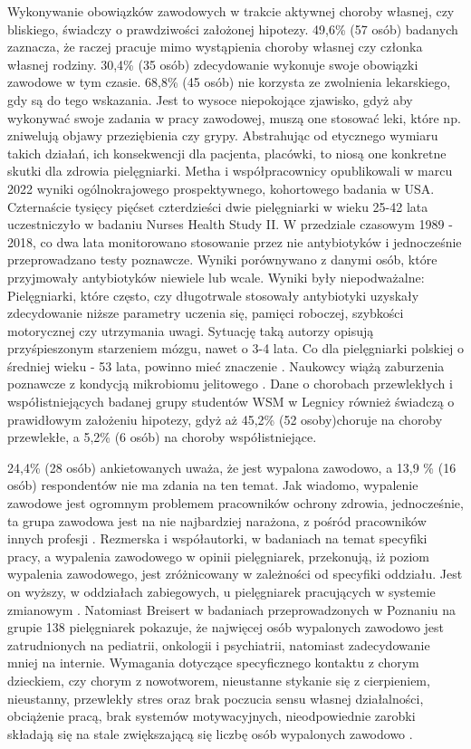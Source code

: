 \documentclass[a4paper,12pt,twoside,openany]{report}
\begin{document}
Wykonywanie obowiązków zawodowych w trakcie aktywnej choroby własnej, czy bliskiego, świadczy o prawdziwości założonej hipotezy. 49,6\%  (57 osób) badanych zaznacza, że raczej pracuje mimo wystąpienia choroby własnej czy członka własnej rodziny. 30,4\%  (35 osób) zdecydowanie wykonuje swoje obowiązki zawodowe w tym czasie. 68,8\% (45 osób) nie korzysta ze zwolnienia lekarskiego, gdy są do tego wskazania. Jest to wysoce niepokojące zjawisko, gdyż aby wykonywać swoje zadania w pracy zawodowej, muszą one stosować leki, które np. zniwelują objawy przeziębienia czy grypy. Abstrahując od etycznego wymiaru takich działań,  ich konsekwencji dla pacjenta, placówki, to niosą one konkretne skutki dla zdrowia pielęgniarki. Metha i współpracownicy opublikowali w marcu 2022 wyniki ogólnokrajowego prospektywnego, kohortowego badania  w USA. Czternaście tysięcy pięćset czterdzieści dwie  pielęgniarki w wieku 25-42 lata uczestniczyło w badaniu Nurses Health Study II. W przedziale czasowym 1989 - 2018, co dwa lata monitorowano stosowanie przez nie antybiotyków i jednocześnie przeprowadzano testy poznawcze. Wyniki porównywano z danymi osób, które przyjmowały antybiotyków niewiele lub wcale. Wyniki były niepodważalne: Pielęgniarki, które często, czy długotrwale stosowały antybiotyki uzyskały zdecydowanie niższe parametry uczenia się, pamięci roboczej, szybkości motorycznej czy utrzymania uwagi. Sytuację taką autorzy opisują przyśpieszonym starzeniem mózgu, nawet o 3-4 lata.  Co dla  pielęgniarki polskiej o średniej wieku - 53 lata, powinno mieć znaczenie \cite{statystyka}.  Naukowcy  wiążą zaburzenia poznawcze z  kondycją mikrobiomu jelitowego \cite{metha}.
Dane o chorobach przewlekłych i współistniejących badanej grupy  studentów WSM w Legnicy  również  świadczą o prawidłowym założeniu hipotezy, gdyż aż 45,2\%  (52 osoby)choruje na choroby przewlekłe, a 5,2\% (6 osób) na choroby współistniejące.


24,4\%  (28 osób) ankietowanych uważa, że jest wypalona zawodowo, a 13,9 \% (16 osób) respondentów nie ma zdania na ten temat. Jak wiadomo, wypalenie zawodowe jest ogromnym problemem pracowników ochrony zdrowia, jednocześnie, ta grupa zawodowa jest na nie najbardziej narażona,  z pośród pracowników innych profesji \cite{wypal}. Rezmerska i współautorki, w badaniach na temat specyfiki pracy, a wypalenia zawodowego w opinii pielęgniarek,  przekonują, iż poziom wypalenia zawodowego, jest zróżnicowany w zależności od specyfiki oddziału. Jest on wyższy, w oddziałach zabiegowych, u pielęgniarek pracujących w systemie zmianowym \cite{zmiany}. Natomiast Breisert w badaniach przeprowadzonych w Poznaniu na grupie 138 pielęgniarek pokazuje, że najwięcej osób wypalonych zawodowo jest zatrudnionych na pediatrii, onkologii i psychiatrii, natomiast zadecydowanie mniej na internie. Wymagania dotyczące specyficznego kontaktu z chorym dzieckiem, czy chorym z nowotworem, nieustanne stykanie się z cierpieniem, nieustanny, przewlekły stres oraz brak poczucia sensu własnej działalności, obciążenie pracą, brak systemów motywacyjnych, nieodpowiednie zarobki składają się na stale zwiększającą się liczbę osób wypalonych zawodowo \cite{breisert}.
\end{document}
